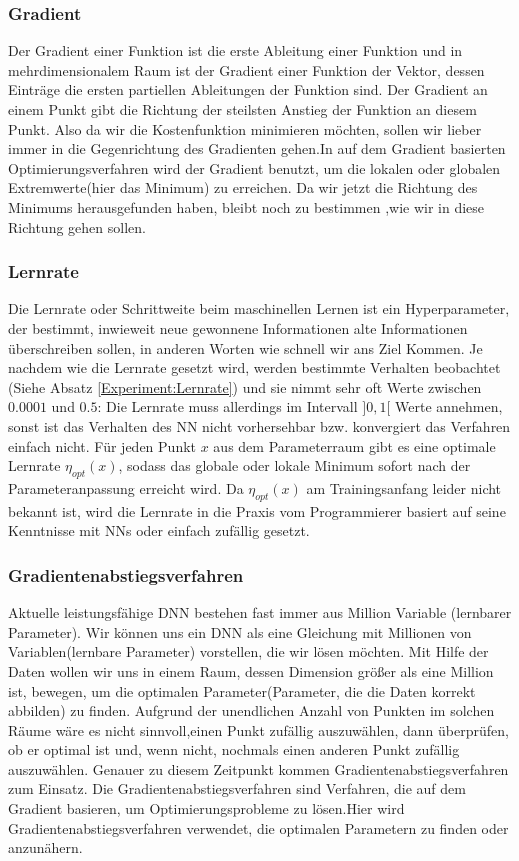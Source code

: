 \documentclass[12pt,a4paper]{scrartcl}
\numberwithin{equation}{section}
\begin{document}
\subsubsection{ Gradient}\label{Gradient}
Der Gradient einer Funktion ist die erste Ableitung einer Funktion und in mehrdimensionalem Raum ist der Gradient einer Funktion der Vektor, dessen Einträge  die ersten partiellen Ableitungen der Funktion sind. Der Gradient an einem Punkt gibt die Richtung der steilsten Anstieg der Funktion an diesem Punkt.  Also da wir die Kostenfunktion minimieren möchten, sollen wir lieber immer in die Gegenrichtung des Gradienten gehen.In auf dem Gradient basierten Optimierungsverfahren wird der Gradient benutzt, um die lokalen oder globalen Extremwerte(hier das Minimum) zu erreichen.
Da wir jetzt die Richtung des Minimums herausgefunden haben, bleibt noch zu bestimmen ,wie wir in diese Richtung gehen  sollen.

\subsubsection{Lernrate}\label{Lernrate}
Die Lernrate oder Schrittweite beim maschinellen Lernen ist ein Hyperparameter, der bestimmt, inwieweit neue gewonnene Informationen alte Informationen überschreiben sollen\cite{LearningRate}, in anderen Worten wie schnell wir ans Ziel Kommen.
Je nachdem wie die Lernrate gesetzt wird, werden bestimmte Verhalten beobachtet (Siehe Absatz \ref{Experiment:Lernrate}) und sie nimmt sehr oft Werte zwischen $ 0.0001 $ und $ 0.5 $:
Die Lernrate muss allerdings im Intervall  $]0,1[$ Werte annehmen, sonst ist das Verhalten des \ac{NN} nicht vorhersehbar bzw. konvergiert das Verfahren einfach nicht.
Für jeden Punkt $ x $ aus dem Parameterraum gibt es eine optimale Lernrate $ \eta_{opt}(x) $, sodass das globale oder lokale Minimum sofort nach der Parameteranpassung erreicht wird. Da $ \eta_{opt}(x) $ am Trainingsanfang leider nicht bekannt ist, wird die Lernrate in die Praxis vom Programmierer basiert auf seine Kenntnisse mit \acsp{NN} oder einfach zufällig gesetzt.

\subsubsection{Gradientenabstiegsverfahren}\label{Gradientenabstiegsverfahren}
Aktuelle leistungsfähige \ac{DNN} bestehen fast immer aus Million Variable (lernbarer Parameter). Wir können uns ein \ac{DNN} als eine Gleichung mit Millionen von Variablen(lernbare Parameter) vorstellen, die wir lösen möchten. Mit Hilfe der Daten wollen wir uns in einem Raum, dessen Dimension größer als eine Million ist, bewegen, um die optimalen Parameter(Parameter, die die Daten korrekt abbilden) zu finden. Aufgrund der unendlichen Anzahl von Punkten im solchen Räume wäre es nicht sinnvoll,einen Punkt zufällig auszuwählen, dann überprüfen, ob er optimal ist und, wenn nicht, nochmals einen anderen Punkt zufällig auszuwählen. Genauer zu diesem Zeitpunkt kommen Gradientenabstiegsverfahren zum Einsatz.
Die Gradientenabstiegsverfahren sind Verfahren, die auf dem Gradient basieren, um Optimierungsprobleme zu lösen.Hier wird Gradientenabstiegsverfahren verwendet, die optimalen Parametern zu finden oder anzunähern.
\end{document}
